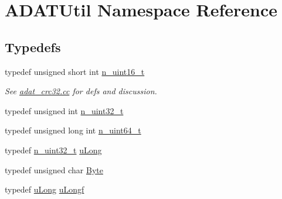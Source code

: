 \hypertarget{namespaceADATUtil}{}\section{A\+D\+A\+T\+Util Namespace Reference}
\label{namespaceADATUtil}
\subsection*{Typedefs}
\begin{DoxyCompactItemize}
\item 
typedef unsigned short int \mbox{\hyperlink{namespaceADATUtil_a8e184fda37156fed1e06319a0051e987}{n\+\_\+uint16\+\_\+t}}
\begin{DoxyCompactList}\small\item\em See \mbox{\hyperlink{adat__crc32_8cc}{adat\+\_\+crc32.\+cc}} for defs and discussion. \end{DoxyCompactList}\item 
typedef unsigned int \mbox{\hyperlink{namespaceADATUtil_ad945a8afa4db2d1f89b731964adae97e}{n\+\_\+uint32\+\_\+t}}
\item 
typedef unsigned long int \mbox{\hyperlink{namespaceADATUtil_afbd9ee3146133429698be74bcf422bd8}{n\+\_\+uint64\+\_\+t}}
\item 
typedef \mbox{\hyperlink{namespaceADATUtil_ad945a8afa4db2d1f89b731964adae97e}{n\+\_\+uint32\+\_\+t}} \mbox{\hyperlink{namespaceADATUtil_a51b60d81747dd992a62e9f1dea60fb13}{u\+Long}}
\item 
typedef unsigned char \mbox{\hyperlink{namespaceADATUtil_a420451c5593252de7271d104b24079b5}{Byte}}
\item 
typedef \mbox{\hyperlink{namespaceADATUtil_a51b60d81747dd992a62e9f1dea60fb13}{u\+Long}} \mbox{\hyperlink{namespaceADATUtil_adf7f8db2cc2f19fe6143cf8a2ad881f4}{u\+Longf}}
\end{DoxyCompactItemize}
